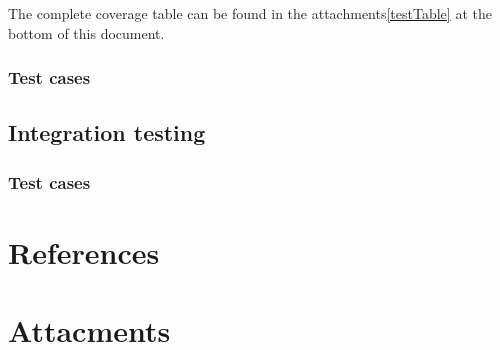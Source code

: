 \documentclass[a4paper, 12pt]{article}
\begin{document}
The complete coverage table can be found in the attachments\ref{testTable} at the bottom of this document.
\\

\subsubsection{Test cases}

\subsection{Integration testing}

\subsubsection{Test cases}

\section{References}

  

   














            
            
           
            
            
            
            
            
            
            
            
            
            \section*{Attacments}
            
\end{document}
